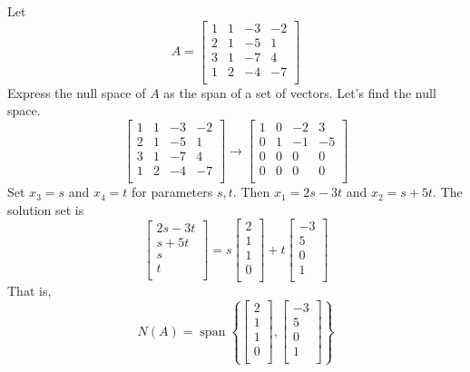\documentclass{article}
\DeclareMathOperator{\spn}{span}
\begin{document}
\begin{example}
  Let
  \[
    A =
    \begin{bmatrix}
      1 & 1 & -3 & -2\\
      2 & 1 & -5 & 1\\
      3 & 1 & -7 & 4\\
      1 & 2 & -4 & -7\\
    \end{bmatrix}
  \]
  Express the null space of $A$ as the span of a set of vectors.
  Let's find the null space.
  \[
    \begin{bmatrix}
      1 & 1 & -3 & -2\\
      2 & 1 & -5 & 1\\
      3 & 1 & -7 & 4\\
      1 & 2 & -4 & -7\\
    \end{bmatrix}
    \to
    \begin{bmatrix}
      1 & 0 & -2 & 3\\
      0 & 1 & -1 & -5\\
      0 & 0 & 0 & 0\\
      0 & 0 & 0 & 0\\
    \end{bmatrix}
  \]
  Set $x_3 = s$ and $x_4 = t$ for parameters $s, t$. Then $x_1 = 2s - 3t$ and $x_2 = s + 5t$. The solution set is
  \[
    \begin{bmatrix}
      2s - 3t\\
      s + 5t\\
      s\\
      t\\
    \end{bmatrix}
    = s
    \begin{bmatrix}
      2\\ 1\\ 1\\ 0\\
    \end{bmatrix}
    +t
    \begin{bmatrix}
      -3 \\ 5 \\ 0 \\ 1\\
    \end{bmatrix}
  \]
  That is, \[
    N(A) = \spn\left\{
      \begin{bmatrix}
        2\\ 1\\ 1\\ 0\\
      \end{bmatrix}
      ,
      \begin{bmatrix}
        -3 \\ 5 \\ 0 \\ 1\\
    \end{bmatrix} \right\}
  \]
\end{example}
\end{document}
